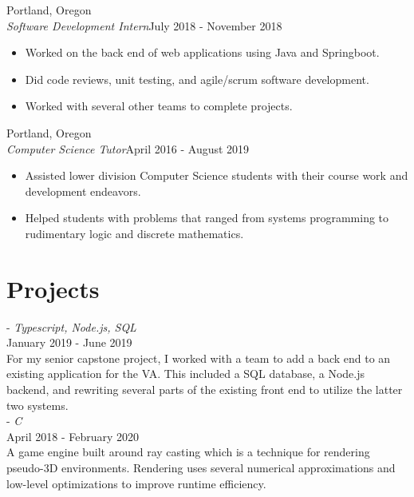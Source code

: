 \documentclass[12pt]{article}
\begin{document}
	\hfill Portland, Oregon\\
	\noindent \emph{Software Development Intern}\hfill July 2018 - November 2018
	\begin{itemize}[noitemsep]
		\item Worked on the back end of web applications using Java and Springboot.
		\item  Did code reviews, unit testing, and agile/scrum software development.
		\item  Worked with several other teams to complete projects.
	\end{itemize}

	\hfill Portland, Oregon\\
	\noindent\emph{Computer Science Tutor}\hfill April 2016 - August 2019
	\begin{itemize}[noitemsep]
		\item Assisted lower division Computer Science students with their course work and development endeavors.
		\item  Helped students with problems that ranged from systems programming to rudimentary logic and discrete mathematics.
	\end{itemize}


	\section*{Projects}
	 - \emph{Typescript, Node.js, SQL} \\
	\noindent January 2019 - June 2019 \\
	\noindent For my senior capstone project, I worked with a team to add a back end to an existing application for the VA.
	This included a SQL database, a Node.js backend, and rewriting several parts of the existing front end to utilize the latter two systems.
	\noindent \\

	 - \emph{C} \\
	\noindent April 2018 - February 2020 \\
	\noindent A game engine built around ray casting which is a technique for rendering pseudo-3D environments. Rendering uses several numerical 
	approximations and low-level optimizations to improve runtime efficiency.\\
\end{document}
